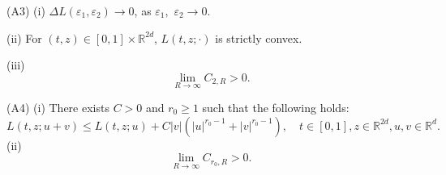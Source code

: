 \documentclass[12pt]{article}
\begin{document}
\noindent
(A3)
(i) $\Delta L(\varepsilon_1,\varepsilon_2)\to
0$, as $\varepsilon_1,$ $\varepsilon_2\to 0$.

\noindent 
(ii)  For $(t,z)\in [0,1]\times\mathbb{R}^{2d}$, $L(t,z;\cdot)$ is strictly convex.

\noindent 
(iii) 
\begin{equation}
\lim_{R\to\infty}C_{2,R}>0.
\end{equation}

\noindent
(A4) 
(i) There exists $C>0$ and $r_0\ge 1$ such that the following holds:
\begin{equation}\label{2.5.0}
L(t,z;u+v)\le L(t,z;u)+C|v|(|u|^{r_0-1}+|v|^{r_0-1}), \quad  t\in [0,1], z\in \mathbb{R}^{2d},u,v \in \mathbb{R}^d.
\end{equation}
(ii)
\begin{equation}\label{2.7.0}
\lim_{R\to\infty}C_{r_0,R}>0.
\end{equation}
\end{document}
